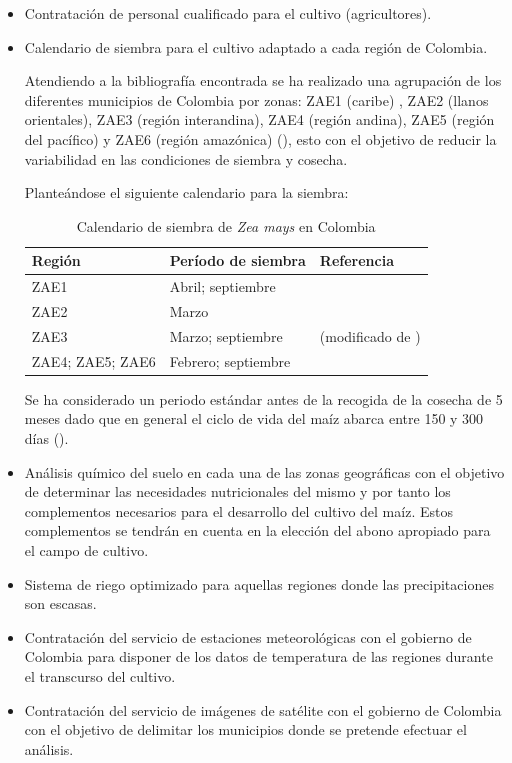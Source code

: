 \documentclass[12pt, spanish]{article}
\begin{document}
\begin{itemize}
    \item Contratación de personal cualificado para el cultivo (agricultores).
    \item Calendario de siembra para el cultivo adaptado a cada región de Colombia.
    
Atendiendo a la bibliografía encontrada se ha realizado una agrupación de los diferentes municipios de Colombia por zonas: ZAE1 (caribe) , ZAE2 (llanos orientales), ZAE3 (región interandina), ZAE4 (región andina), ZAE5 (región del pacífico)  y ZAE6 (región amazónica) (\cite{FAO2006a}), esto con el objetivo de reducir la variabilidad en las condiciones de siembra y cosecha.

Planteándose el siguiente calendario para la siembra:
\newpage

\begin{table}[h!]
    \centering
    \begin{tabular}{ |p{5cm}|p{5cm}|p{5cm}|  }
        \hline
        Región & Período de siembra & Referencia  \\
        \hline
        ZAE1 & Abril; septiembre &  \\
        ZAE2 & Marzo  &  \\
        ZAE3 & Marzo; septiembre & (modificado de \cite{FAO2006a})  \\
        ZAE4; ZAE5; ZAE6 & Febrero; septiembre &  \\
        \hline
    \end{tabular}
    \caption{Calendario de siembra de \textit{Zea mays} en Colombia}
    \label{tab:1}
\end{table}



Se ha considerado un periodo estándar antes de la recogida de la cosecha de 5 meses dado que en general el ciclo de vida del maíz abarca entre 150 y 300 días (\cite{Fisiomaizfenalce2011}).

\item Análisis químico del suelo en cada una de las zonas geográficas con el objetivo de determinar las necesidades nutricionales del mismo y por tanto los complementos necesarios para el desarrollo del cultivo del maíz. Estos complementos se tendrán en cuenta en la elección del abono apropiado para el campo de cultivo.

\item Sistema de riego optimizado para aquellas regiones donde las precipitaciones son escasas.

\item Contratación del servicio de estaciones meteorológicas con el gobierno de Colombia para disponer de los datos de temperatura de las regiones durante el transcurso del cultivo.

\item Contratación del servicio de imágenes de satélite con el gobierno de Colombia con el objetivo de delimitar los municipios donde se pretende efectuar el análisis. 

\end{itemize}
\end{document}
